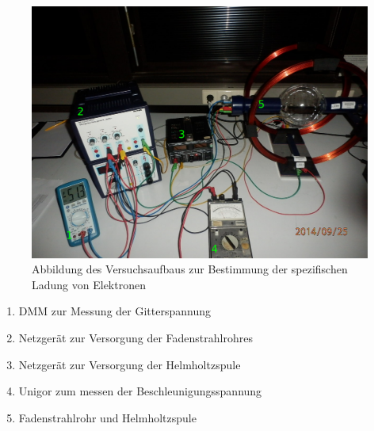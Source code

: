 \documentclass[12pt,a4paper]{article}
\begin{document}
\begin{figure}[H] 
  \centering
    \includegraphics[scale = 0.3]{aufbau_h.pdf}
  	\caption[Abbildung des Versuchsaufbaus zur Bestimmung der spezifischen Ladung von Elektronen]{Abbildung des Versuchsaufbaus zur Bestimmung der spezifischen Ladung von Elektronen}
  \label{fig:aufbau_h}
\end{figure}

\begin{enumerate}
\item	DMM zur Messung der Gitterspannung

\item	Netzgerät zur Versorgung der Fadenstrahlrohres

\item	Netzgerät zur Versorgung der Helmholtzspule

\item	Unigor zum messen der Beschleunigungsspannung

\item	Fadenstrahlrohr und Helmholtzspule
\end{enumerate}
\end{document}
